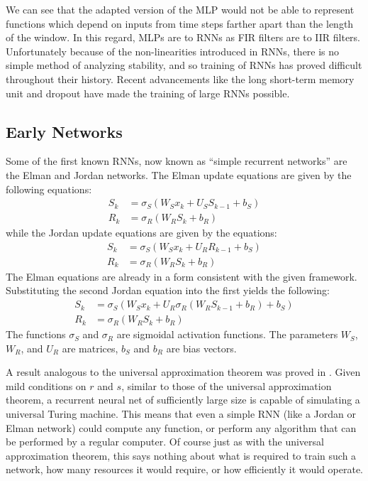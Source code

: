 We can see that the adapted version of the MLP would not be able to represent functions which depend on inputs from time steps farther apart than the length of the window.  In this regard, MLPs are to RNNs as FIR filters are to IIR filters.  Unfortunately because of the non-linearities introduced in RNNs, there is no simple method of analyzing stability, and so training of RNNs has proved difficult throughout their history.  Recent advancements like the long short-term memory unit and dropout have made the training of large RNNs possible.

\subsection{Early Networks}
Some of the first known RNNs, now known as ``simple recurrent networks'' are the Elman \cite{je90} and Jordan \cite{mj86} networks.  The Elman update equations are given by the following equations:
\begin{align}
S_k &= \sigma_S(W_Sx_k+U_SS_{k-1}+b_S\label{eq:elman_s})\\
R_k &= \sigma_R(W_RS_k+b_R)\label{eq:elman_y}
\end{align}
while the Jordan update equations are given by the equations:
\begin{align}
S_k &= \sigma_S(W_Sx_k+U_R R_{k-1}+b_S) \label{eq:newj_s} \\
R_k &= \sigma_R(W_R S_k + b_R) \label{eq:newj_y}
\end{align}
The Elman equations are already in a form consistent with the given framework.  Substituting the second Jordan equation into the first yields the following:
\begin{align}
S_k &= \sigma_S(W_Sx_k+U_R \sigma_R(W_R S_{k-1} + b_R)+b_S)\label{eq:jordan_s}\\
R_k &= \sigma_R(W_R S_k + b_R) \label{eq:jordan_y}
\end{align}
The functions $\sigma_S$ and $\sigma_R$ are sigmoidal activation functions.  The parameters $W_S$,$W_R$, and $U_R$ are matrices, $b_S$ and $b_R$ are bias vectors.

A result analogous to the universal approximation theorem was proved in \cite{hs91}.  Given mild conditions on $r$ and $s$, similar to those of the universal approximation theorem, a recurrent neural net of sufficiently large size is capable of simulating a universal Turing machine.  This means that even a simple RNN (like a Jordan or Elman network) could compute any function, or perform any algorithm that can be performed by a regular computer.  Of course just as with the universal approximation theorem, this says nothing about what is required to train such a network, how many resources it would require, or how efficiently it would operate.

